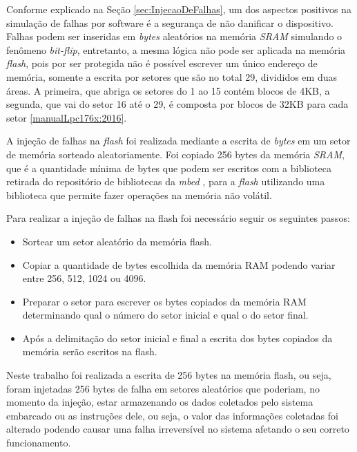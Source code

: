 Conforme explicado na Seção \ref{sec:InjecaoDeFalhas}, um dos aspectos positivos na simulação de falhas por software é a segurança de não danificar o dispositivo. Falhas podem ser inseridas em \textit{bytes} aleatórios na memória \textit{SRAM} simulando o fenômeno \textit{bit-flip}, entretanto, a mesma lógica não pode ser aplicada na memória \textit{flash}, pois por ser protegida não é possível escrever um único endereço de memória, somente a escrita por setores que são no total 29, divididos em duas áreas. A primeira, que abriga os setores do 1 ao 15 contém blocos de 4KB, a segunda, que vai do setor 16 até o 29, é composta por blocos de 32KB para cada setor \ref{manualLpc176x:2016}.

A injeção de falhas na \textit{flash} foi realizada mediante a escrita de \textit{bytes} em um setor de memória sorteado aleatoriamente. Foi copiado 256 bytes da memória \textit{SRAM}, que é a quantidade mínima de bytes que podem ser escritos com a biblioteca retirada do repositório de bibliotecas da \textit{mbed} \cite{escritaNaFlash:2016}, para a \textit{flash} utilizando uma biblioteca que permite fazer operações na memória não volátil. 

Para realizar a injeção de falhas na flash foi necessário seguir os seguintes passos:

\begin{itemize}
	\item Sortear um setor aleatório da memória flash.
	
	\item Copiar a quantidade de bytes escolhida da memória RAM podendo variar entre 256, 512, 1024 ou 4096.
	
	\item Preparar o setor para escrever os bytes copiados da memória RAM determinando qual o número do setor inicial e qual o do setor final.
	
	\item Após a delimitação do setor inicial e final a escrita dos bytes copiados da memória serão escritos na flash.
	
\end{itemize}

Neste trabalho foi realizada a escrita de 256 bytes na memória flash, ou seja, foram injetadas 256 bytes de falha em setores aleatórios que poderiam, no momento da injeção, estar armazenando os dados coletados pelo sistema embarcado ou as instruções dele, ou seja, o valor das informações coletadas foi alterado podendo causar uma falha irreversível no sistema afetando o seu correto funcionamento.

